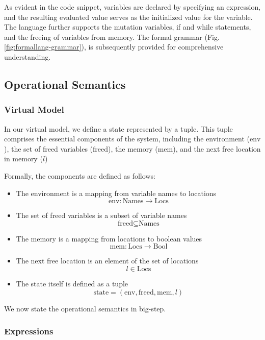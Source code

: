 As evident in the code snippet, variables are declared by specifying an expression, and the resulting evaluated value serves as the initialized value for the variable. The language further supports the mutation variables, if and while statements, and the freeing of variables from memory. The formal grammar (Fig. \ref{fig:formallang-grammar}), is subsequently provided for comprehensive understanding.

\subsection{Operational Semantics}

\subsubsection{Virtual Model}

In our virtual model, we define a state represented by a tuple. This tuple comprises the essential components of the system, including the environment ($\text{env}$), the set of freed variables ($\text{freed}$), the memory ($\text{mem}$), and the next free location in memory ($l$)

Formally, the components are defined as follows:

\begin{itemize}
    \item The environment is a mapping from variable names to locations
          $$\text{env}: \text{Names} \to \text{Locs}$$
    \item The set of freed variables is a subset of variable names
          $$\text{freed} \subseteq \text{Names}$$
    \item The memory is a mapping from locations to boolean values
          $$\text{mem}: \text{Locs} \to \text{Bool}$$
    \item The next free location is an element of the set of locations
          $$l \in \text{Locs}$$
    \item The state itself is defined as a tuple
          $$\text{state} = (\text{env}, \text{freed}, \text{mem}, l)$$
\end{itemize}

We now state the operational semantics in big-step.

\subsubsection{Expressions}

